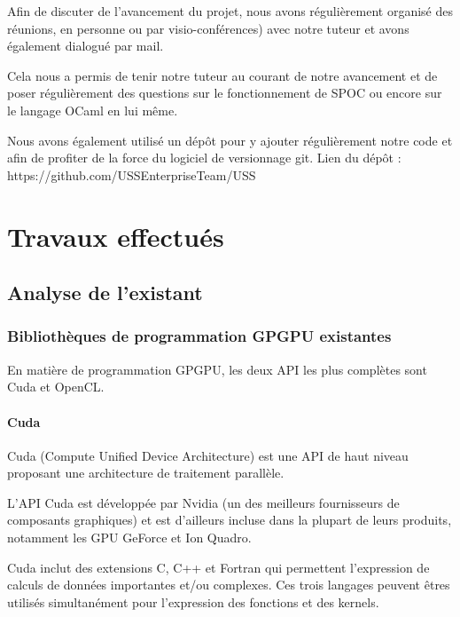 \documentclass{report}
\begin{document}
Afin de discuter de l'avancement du projet, nous avons régulièrement organisé des réunions, en personne ou par visio-conférences) avec notre tuteur et avons également dialogué par mail.\newline

Cela nous a permis de tenir notre tuteur au courant de notre avancement et de poser régulièrement des questions sur le fonctionnement de SPOC ou encore sur le langage OCaml en lui même.\newline

Nous avons également utilisé un dépôt pour y ajouter régulièrement notre code et afin de profiter de la force du logiciel de versionnage git.\newline
Lien du dépôt : https://github.com/USSEnterpriseTeam/USS

\chapter{Travaux effectués}
\section{Analyse de l'existant}
\subsection{Bibliothèques de programmation GPGPU existantes}

En matière de programmation GPGPU, les deux API les plus complètes sont Cuda et OpenCL.
\subsubsection{Cuda}

Cuda (Compute Unified Device Architecture) est une API de haut niveau proposant une architecture de traitement parallèle.\newline

L'API Cuda est développée par Nvidia (un des meilleurs fournisseurs de composants graphiques) et est d'ailleurs incluse dans la plupart de leurs produits, notamment les GPU GeForce et Ion Quadro.\newline

Cuda inclut des extensions C, C++ et Fortran qui permettent l'expression de calculs de données importantes et/ou complexes.\newline
Ces trois langages peuvent êtres utilisés simultanément pour l'expression des fonctions et des kernels.\newline
\end{document}
